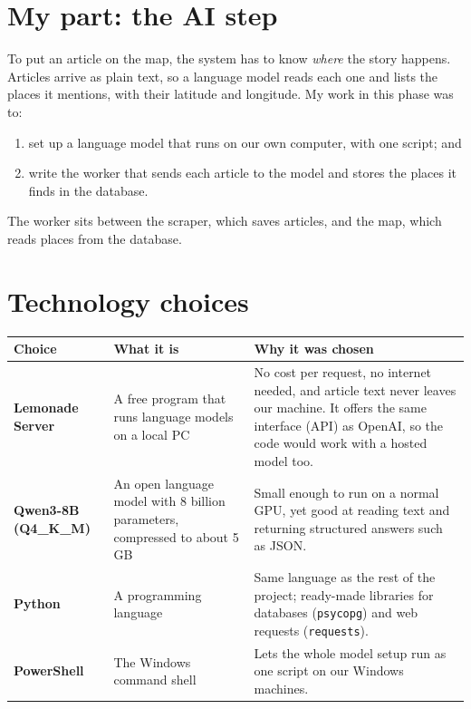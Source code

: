 \documentclass[11pt,a4paper]{article}
\newcommand{\head}[1]{\textbf{#1}}
\newcommand{\code}[1]{\texttt{#1}}
\begin{document}
\section{My part: the AI step}

To put an article on the map, the system has to know \emph{where} the story
happens. Articles arrive as plain text, so a language model reads each one and
lists the places it mentions, with their latitude and longitude. My work in
this phase was to:

\begin{enumerate}
  \item set up a language model that runs on our own computer, with one script; and
  \item write the worker that sends each article to the model and stores the places it finds in the database.
\end{enumerate}

The worker sits between the scraper, which saves articles, and the map, which
reads places from the database.

\section{Technology choices}

\begin{tabularx}{\textwidth}{>{\bfseries}p{3.2cm} p{4.3cm} L}
\toprule
{} \head{Choice} & \head{What it is} & \head{Why it was chosen} \\
\midrule
Lemonade Server & A free program that runs language models on a local PC & No cost per request, no internet needed, and article text never leaves our machine. It offers the same interface (API) as OpenAI, so the code would work with a hosted model too. \\
Qwen3-8B (Q4\_K\_M) & An open language model with 8 billion parameters, compressed to about 5\,GB & Small enough to run on a normal GPU, yet good at reading text and returning structured answers such as JSON. \\
Python & A programming language & Same language as the rest of the project; ready-made libraries for databases (\code{psycopg}) and web requests (\code{requests}). \\
PowerShell & The Windows command shell & Lets the whole model setup run as one script on our Windows machines. \\
\bottomrule
\end{tabularx}
\end{document}
